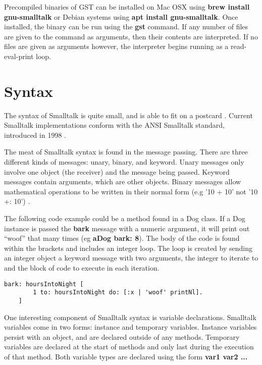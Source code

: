 Precompiled binaries of GST can be installed on Mac OSX using \textbf{brew install gnu-smalltalk} or Debian systems using \textbf{apt install gnu-smalltalk}. Once installed, the binary can be run using the \textbf{gst} command. If any number of files are given to the command as arguments, then their contents are interpreted. If no files are given as arguments however, the interpreter begins running as a read-eval-print loop.

\section{Syntax}

The syntax of Smalltalk is quite small, and is able to fit on a postcard \cite{postcard}. Current Smalltalk implementations conform with the ANSI Smalltalk standard, introduced in 1998 \cite{ansi}.

The meat of Smalltalk syntax is found in the message passing. There are three different kinds of messages: unary, binary, and keyword. Unary messages only involve one object (the receiver) and the message being passed. Keyword messages contain arguments, which are other objects. Binary messages allow mathematical operations to be written in their normal form (e.g '10 + 10' not '10 +: 10') \cite{thebluebook}.

The following code example could be a method found in a Dog class. If a Dog instance is passed the \textbf{bark} message with a numeric argument, it will print out ``woof'' that many times (eg \textbf{aDog bark: 8}). The body of the code is found within the brackets and includes an integer loop. The loop is created by sending an integer object a keyword message with two arguments, the integer to iterate to and the block of code to execute in each iteration.

\begin{lstlisting}[language=Simula]
bark: hoursIntoNight [
        1 to: hoursIntoNight do: [:x | 'woof' printNl].
    ]
\end{lstlisting}

One interesting component of Smalltalk syntax is variable declarations. Smalltalk variables come in two forms: instance and temporary variables. Instance variables persist with an object, and are declared outside of any methods. Temporary variables are declared at the start of methods and only last during the execution of that method. Both variable types are declared using the form \textbf{ \textbar var1 var2 ... \textbar }


